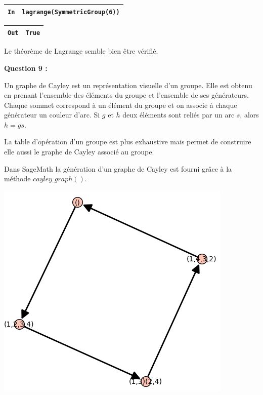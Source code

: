 \documentclass[titlepage]{article}
\begin{document}
    \begin{tabularx}{11.5cm}{|p{0.60cm}|X|}
        \hline
        \verb|In|
        & 
        \verb|lagrange(SymmetricGroup(6))|
        \\
        \hline
    \end{tabularx}\newline
    \begin{tabularx}{11.5cm}{|p{0.60cm}|X|}
        \hline
        \verb|Out|
        & 
        \verb|True|
        \\
        \hline
    \end{tabularx}\newline

    Le théorème de Lagrange semble bien être vérifié.
    \newline

    \textbf{Question 9 :}

    Un graphe de Cayley est un représentation visuelle d'un groupe. Elle est obtenu en prenant l'ensemble des éléments du groupe et l'ensemble de ses générateurs.
    Chaque sommet correspond à un élément du groupe et on associe à chaque générateur un couleur d'arc. Si $g$ et $h$ deux éléments sont reliés par un arc $s$, alors $h = gs$.

    La table d'opération d'un groupe est plus exhaustive mais permet de construire elle aussi le graphe de Cayley associé au groupe.

    Dans SageMath la génération d'un graphe de Cayley est fourni grâce à la méthode $cayley\_graph()$.

    \begin{center}
        \includegraphics[scale=0.5]{q91.png}
    \end{center}
\end{document}
